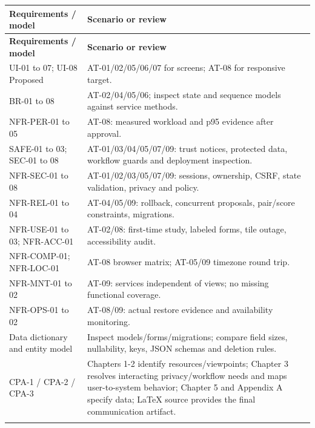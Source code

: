 \documentclass[12pt,a4paper,oneside]{report}
\begin{document}
\begin{longtable}{@{}P{0.37\dimexpr\textwidth-12pt\relax}P{0.63\dimexpr\textwidth-12pt\relax}@{}}

\toprule \textbf{Requirements / model} & \textbf{Scenario or review} \\ \midrule\endfirsthead

\toprule \textbf{Requirements / model} & \textbf{Scenario or review} \\ \midrule\endhead

\bottomrule\endfoot

UI-01 to 07; UI-08 Proposed & AT-01/02/05/06/07 for screens; AT-08 for responsive target. \\ \addlinespace[3pt]

BR-01 to 08 & AT-02/04/05/06; inspect state and sequence models against service methods. \\ \addlinespace[3pt]

NFR-PER-01 to 05 & AT-08: measured workload and p95 evidence after approval. \\ \addlinespace[3pt]

SAFE-01 to 03; SEC-01 to 08 & AT-01/03/04/05/07/09: trust notices, protected data, workflow guards and deployment inspection. \\ \addlinespace[3pt]

NFR-SEC-01 to 08 & AT-01/02/03/05/07/09: sessions, ownership, CSRF, state validation, privacy and policy. \\ \addlinespace[3pt]

NFR-REL-01 to 04 & AT-04/05/09: rollback, concurrent proposals, pair/score constraints, migrations. \\ \addlinespace[3pt]

NFR-USE-01 to 03; NFR-ACC-01 & AT-02/08: first-time study, labeled forms, tile outage, accessibility audit. \\ \addlinespace[3pt]

NFR-COMP-01; NFR-LOC-01 & AT-08 browser matrix; AT-05/09 timezone round trip. \\ \addlinespace[3pt]

NFR-MNT-01 to 02 & AT-09: services independent of views; no missing functional coverage. \\ \addlinespace[3pt]

NFR-OPS-01 to 02 & AT-08/09: actual restore evidence and availability monitoring. \\ \addlinespace[3pt]

Data dictionary and entity model & Inspect models/forms/migrations; compare field sizes, nullability, keys, JSON schemas and deletion rules. \\ \addlinespace[3pt]

CPA-1 / CPA-2 / CPA-3 & Chapters 1-2 identify resources/viewpoints; Chapter 3 resolves interacting privacy/workflow needs and maps user-to-system behavior; Chapter 5 and Appendix A specify data; LaTeX source provides the final communication artifact. \\ \addlinespace[3pt]

\end{longtable}
\end{document}
